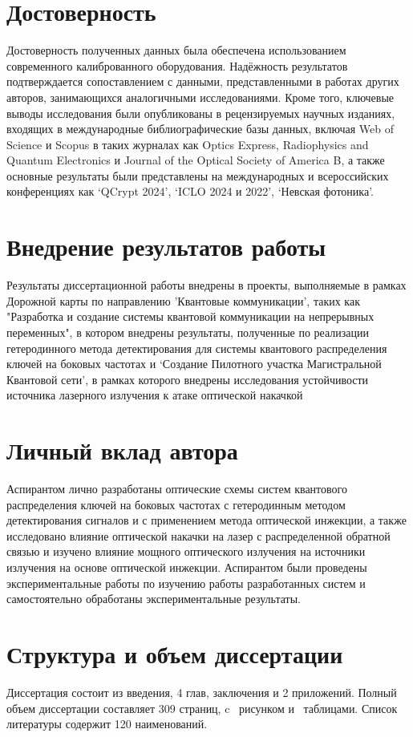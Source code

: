 \section*{Достоверность}
Достоверность полученных данных была обеспечена использованием современного калиброванного оборудования. Надёжность результатов подтверждается сопоставлением с данными, представленными в работах других авторов, занимающихся аналогичными исследованиями. 
Кроме того, ключевые выводы исследования были опубликованы в рецензируемых научных изданиях, входящих в международные библиографические базы данных, включая Web of Science и Scopus в таких журналах как Optics Express, Radiophysics and Quantum Electronics и Journal of the Optical Society of America B, а также основные результаты были представлены на международных и всероссийских конференциях как `QCrypt 2024', `ICLO 2024 и 2022', `Невская фотоника'.
\section*{Внедрение результатов работы}
Результаты диссертационной работы внедрены в проекты, выполняемые в рамках Дорожной карты по направлению 'Квантовые коммуникации', таких как  "Разработка и создание системы квантовой коммуникации на непрерывных переменных", в котором внедрены результаты, полученные по реализации гетеродинного метода детектирования для системы квантового распределения ключей на боковых частотах  и `Создание Пилотного участка Магистральной Квантовой сети', в рамках которого внедрены исследования устойчивости источника лазерного излучения к атаке оптической накачкой


\section*{Личный вклад автора}
Аспирантом лично разработаны оптические схемы систем квантового распределения ключей на боковых частотах с гетеродинным методом детектирования сигналов и с применением метода оптической инжекции, а также исследовано влияние оптической накачки на лазер с распределенной обратной связью и изучено влияние мощного оптического излучения на источники излучения на основе оптической инжекции. Аспирантом были проведены экспериментальные работы по изучению работы разработанных систем и самостоятельно обработаны экспериментальные результаты.
\section*{Структура и объем диссертации} Диссертация состоит из введения, 4 глав, заключения и 2 приложений. Полный объем диссертации составляет  309 страниц, c  \totalfigures\ рисунком  и \totaltables\ таблицами. Список литературы содержит 120 наименований.


